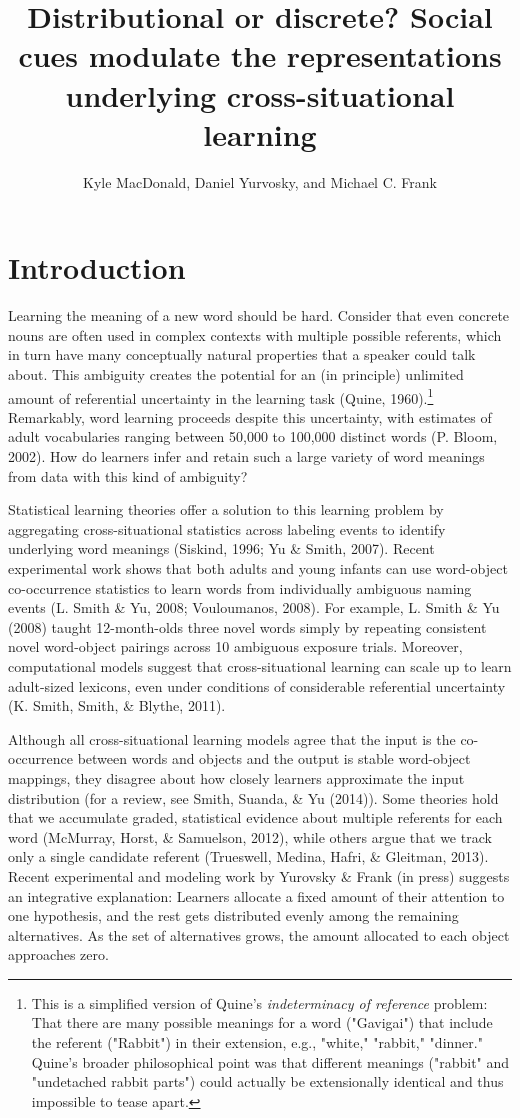 \documentclass[a4paper,man,natbib]{apa6}
\date{}
\title{\textbf{Distributional or discrete? Social cues modulate the representations
underlying cross-situational learning}}
\author{Kyle MacDonald, Daniel Yurvosky, and Michael C. Frank}
\affiliation{Department of Psychology, Stanford University}
\begin{document}
\maketitle

\section{Introduction}\label{introduction}

Learning the meaning of a new word should be hard. Consider that even
concrete nouns are often used in complex contexts with multiple possible
referents, which in turn have many conceptually natural properties that
a speaker could talk about. This ambiguity creates the potential for an
(in principle) unlimited amount of referential uncertainty in the
learning task (Quine,
1960).\footnote{This is a simplified version of Quine's \textit{indeterminacy of reference} problem: That there are many possible meanings for a word ("Gavigai") that include the referent ("Rabbit") in their extension, e.g., "white," "rabbit," "dinner." Quine's broader philosophical point was that different meanings ("rabbit" and "undetached rabbit parts") could actually be extensionally identical and thus impossible to tease apart.}
Remarkably, word learning proceeds despite this uncertainty, with
estimates of adult vocabularies ranging between 50,000 to 100,000
distinct words (P. Bloom, 2002). How do learners infer and retain such a
large variety of word meanings from data with this kind of ambiguity?

Statistical learning theories offer a solution to this learning problem
by aggregating cross-situational statistics across labeling events to
identify underlying word meanings (Siskind, 1996; Yu \& Smith, 2007).
Recent experimental work shows that both adults and young infants can
use word-object co-occurrence statistics to learn words from
individually ambiguous naming events (L. Smith \& Yu, 2008; Vouloumanos,
2008). For example, L. Smith \& Yu (2008) taught 12-month-olds three
novel words simply by repeating consistent novel word-object pairings
across 10 ambiguous exposure trials. Moreover, computational models
suggest that cross-situational learning can scale up to learn
adult-sized lexicons, even under conditions of considerable referential
uncertainty (K. Smith, Smith, \& Blythe, 2011).

Although all cross-situational learning models agree that the input is
the co-occurrence between words and objects and the output is stable
word-object mappings, they disagree about how closely learners
approximate the input distribution (for a review, see Smith, Suanda, \&
Yu (2014)). Some theories hold that we accumulate graded, statistical
evidence about multiple referents for each word (McMurray, Horst, \&
Samuelson, 2012), while others argue that we track only a single
candidate referent (Trueswell, Medina, Hafri, \& Gleitman, 2013). Recent
experimental and modeling work by Yurovsky \& Frank (in press) suggests
an integrative explanation: Learners allocate a fixed amount of their
attention to one hypothesis, and the rest gets distributed evenly among
the remaining alternatives. As the set of alternatives grows, the amount
allocated to each object approaches zero.
\end{document}
